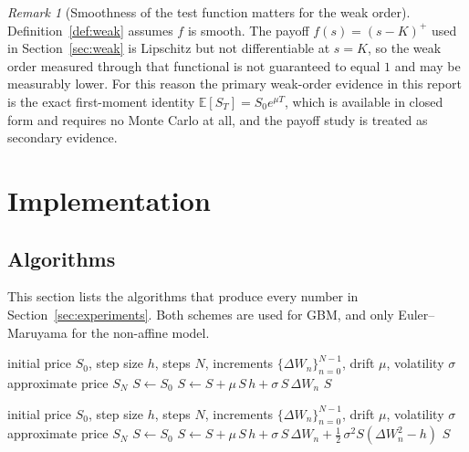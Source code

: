 \documentclass[11pt,a4paper]{article}
\theoremstyle{definition}
\theoremstyle{remark}
\newtheorem{remark}[theorem]{Remark}
\begin{document}
\begin{remark}[Smoothness of the test function matters for the weak order]
\label{rem:weak-smoothness}
Definition~\ref{def:weak} assumes $f$ is smooth. The payoff $f(s) = (s - K)^+$ used in Section~\ref{sec:weak} is Lipschitz but not differentiable at $s = K$, so the weak order measured through that functional is not guaranteed to equal $1$ and may be measurably lower. For this reason the primary weak-order evidence in this report is the exact first-moment identity $\mathbb{E}[S_T] = S_0 e^{\mu T}$, which is available in closed form and requires no Monte Carlo at all, and the payoff study is treated as secondary evidence.
\end{remark}

\newpage
\section{Implementation}
\label{sec:implementation}

\subsection{Algorithms}
\label{sec:algorithms}

This section lists the algorithms that produce every number in
Section~\ref{sec:experiments}. Both schemes are used for GBM, and only
Euler--Maruyama for the non-affine model.

\begin{algorithm}[H]
\caption{Euler--Maruyama (EM) for GBM, $dS = \mu S\,dt + \sigma S\,dW$}
\label{alg:em}
\begin{algorithmic}[1]
\Require initial price $S_0$, step size $h$, steps $N$,
         increments $\{\Delta W_n\}_{n=0}^{N-1}$, drift $\mu$, volatility $\sigma$
\Ensure approximate price $S_N$
\State $S \leftarrow S_0$
    \State $S \leftarrow S + \mu\, S\, h + \sigma\, S\, \Delta W_n$
\EndFor
\State \Return $S$
\end{algorithmic}
\end{algorithm}

\begin{algorithm}[H]
\caption{Milstein for GBM, $dS = \mu S\,dt + \sigma S\,dW$}
\label{alg:milstein}
\begin{algorithmic}[1]
\Require initial price $S_0$, step size $h$, steps $N$,
         increments $\{\Delta W_n\}_{n=0}^{N-1}$, drift $\mu$, volatility $\sigma$
\Ensure approximate price $S_N$
\State $S \leftarrow S_0$
    \State $S \leftarrow S + \mu\, S\, h + \sigma\, S\, \Delta W_n
                    + \tfrac12\, \sigma^2 S \left( \Delta W_n^2 - h \right)$
\EndFor
\State \Return $S$
\end{algorithmic}
\end{algorithm}
\end{document}
